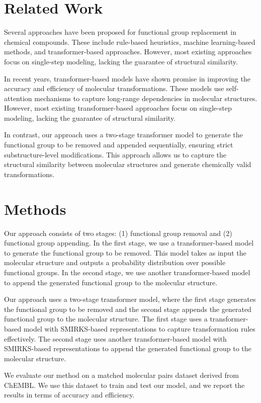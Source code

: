 \documentclass[12pt, a4paper]{article}
\begin{document}
\section{Related Work}

Several approaches have been proposed for functional group replacement in chemical compounds. These include rule-based heuristics, machine learning-based methods, and transformer-based approaches. However, most existing approaches focus on single-step modeling, lacking the guarantee of structural similarity.

In recent years, transformer-based models have shown promise in improving the accuracy and efficiency of molecular transformations. These models use self-attention mechanisms to capture long-range dependencies in molecular structures. However, most existing transformer-based approaches focus on single-step modeling, lacking the guarantee of structural similarity.

In contrast, our approach uses a two-stage transformer model to generate the functional group to be removed and appended sequentially, ensuring strict substructure-level modifications. This approach allows us to capture the structural similarity between molecular structures and generate chemically valid transformations.

\section{Methods}

Our approach consists of two stages: (1) functional group removal and (2) functional group appending. In the first stage, we use a transformer-based model to generate the functional group to be removed. This model takes as input the molecular structure and outputs a probability distribution over possible functional groups. In the second stage, we use another transformer-based model to append the generated functional group to the molecular structure.

Our approach uses a two-stage transformer model, where the first stage generates the functional group to be removed and the second stage appends the generated functional group to the molecular structure. The first stage uses a transformer-based model with SMIRKS-based representations to capture transformation rules effectively. The second stage uses another transformer-based model with SMIRKS-based representations to append the generated functional group to the molecular structure.

We evaluate our method on a matched molecular pairs dataset derived from ChEMBL. We use this dataset to train and test our model, and we report the results in terms of accuracy and efficiency.
\end{document}
